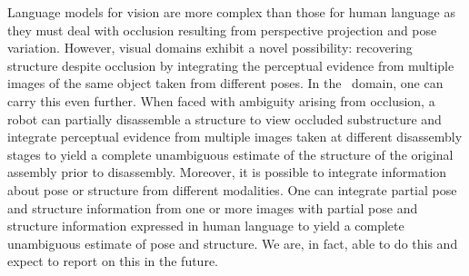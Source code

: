 Language models for vision are more complex than those for human language as
they must deal with occlusion resulting from perspective projection and pose
variation.
%
However, visual domains exhibit a novel possibility: recovering structure
despite occlusion by integrating the perceptual evidence from multiple images
of the same object taken from different poses.
%
In the \LincolnLog\ domain, one can carry this even further.
%
When faced with ambiguity arising from occlusion, a robot can partially
disassemble a structure to view occluded substructure and integrate perceptual
evidence from multiple images taken at different disassembly stages to yield a
complete unambiguous estimate of the structure of the original assembly prior
to disassembly.
%
Moreover, it is possible to integrate information about pose or structure from
different modalities.
%
One can integrate partial pose and structure information from one or more
images with partial pose and structure information expressed in human language
to yield a complete unambiguous estimate of pose and structure.
%
We are, in fact, able to do this and expect to report on this in the future.
